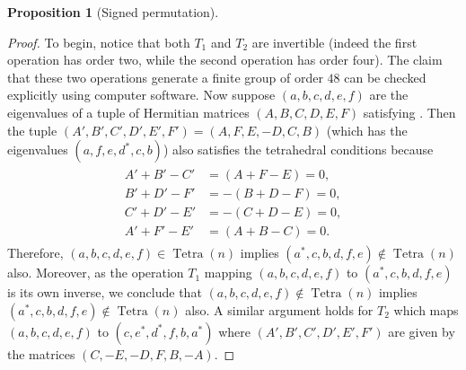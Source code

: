 \documentclass[notitlepage, 11pt, letterpaper]{amsart}
\theoremstyle{plain}
\newtheorem{prop}[thm]{Proposition}
\theoremstyle{definition}
\let\cref\crtcref
\DeclareMathOperator{\Tetra}{Tetra}
\newcommand{\ea}{a}
\newcommand{\eb}{b}
\newcommand{\ec}{c}
\newcommand{\ed}{d}
\newcommand{\ee}{e}
\newcommand{\ef}{f}
\begin{document}
\begin{prop}[Signed permutation]
\end{prop}
\begin{proof}
    To begin, notice that both $T_1$ and $T_2$ are invertible (indeed the first operation has order two, while the second operation has order four).
    The claim that these two operations generate a finite group of order $48$ can be checked explicitly using computer software.
    Now suppose $(\ea,\eb,\ec,\ed,\ee,\ef)$ are the eigenvalues of a tuple of Hermitian matrices $(A,B,C,D,E,F)$ satisfying \cref{eq:tet_cond}.
    Then the tuple $(A',B',C',D',E',F') = (A,F,E,-D,C,B)$ (which has the eigenvalues $(\ea, \ef, \ee, \ed^{*}, \ec, \eb)$) also satisfies the tetrahedral conditions because
    \begin{align}
        \label{eq:signed_perm_rows}
        \begin{split}
            A'+B'-C' &= (A+F-E) = 0,  \\
            B'+D'-F' &= -(B+D-F) = 0, \\
            C'+D'-E' &= -(C+D-E) = 0, \\
            A'+F'-E' &= (A+B-C) = 0.
        \end{split}
    \end{align}
    Therefore, $(\ea,\eb,\ec,\ed,\ee,\ef) \in \Tetra(n)$ implies $(\ea^*, \ec, \eb, \ed, \ef, \ee) \not \in \Tetra(n)$ also.
    Moreover, as the operation $T_1$ mapping $(\ea,\eb,\ec,\ed,\ee,\ef)$ to $(\ea^*, \ec, \eb, \ed, \ef, \ee)$ is its own inverse, we conclude that $(\ea,\eb,\ec,\ed,\ee,\ef) \not \in \Tetra(n)$ implies $(\ea^*, \ec, \eb, \ed, \ef, \ee) \not \in \Tetra(n)$ also.
    A similar argument holds for $T_2$ which maps $(\ea,\eb,\ec,\ed,\ee,\ef)$ to $(\ec, \ee^*, \ed^{*}, \ef, \eb, \ea^*)$ where $(A',B',C',D',E',F')$ are given by the matrices $(C,-E,-D,F,B,-A)$.
\end{proof}
\end{document}
